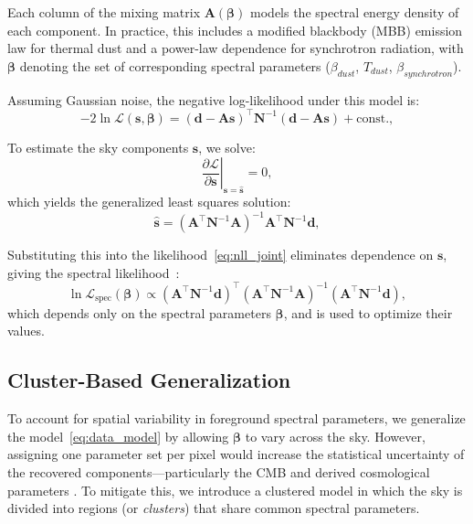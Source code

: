 \documentclass[%
 reprint,
bibnotes,
 amsmath,amssymb,
 aps,
floatfix, 
]{revtex4-2}
\begin{document}
Each column of the mixing matrix \( \mathbf{A}(\boldsymbol{\beta}) \) models the spectral energy density of each component. In practice, this includes a modified blackbody (MBB) emission law for thermal dust and a power-law dependence for synchrotron radiation, with \( \boldsymbol{\beta} \) denoting the set of corresponding spectral parameters ($\beta_{dust}$, $T_{dust}$, $\beta_{synchrotron}$). 

Assuming Gaussian noise, the negative log-likelihood under this model is:
\begin{equation}
    -2 \ln \mathcal{L}(\mathbf{s}, \boldsymbol{\beta}) = (\mathbf{d} - \mathbf{A} \mathbf{s})^\top \mathbf{N}^{-1} (\mathbf{d} - \mathbf{A} \mathbf{s}) + \text{const.},
    \label{eq:nll_joint}
\end{equation}

To estimate the sky components \( \mathbf{s} \), we solve:
\begin{equation}
    \left. \frac{\partial \mathcal{L}}{\partial \mathbf{s}} \right|_{\mathbf{s} = \hat{\mathbf{s}}} = 0,
\end{equation}
which yields the generalized least squares solution:
\begin{equation}
    \hat{\mathbf{s}} = \left( \mathbf{A}^\top \mathbf{N}^{-1} \mathbf{A} \right)^{-1} \mathbf{A}^\top \mathbf{N}^{-1} \mathbf{d},
    \label{eq:mle_solution}
\end{equation}

Substituting this into the likelihood~\eqref{eq:nll_joint} eliminates dependence on \( \mathbf{s} \), giving the spectral likelihood~\citep{Stompor_2009}:
\begin{equation}
    \ln \mathcal{L}_{\mathrm{spec}}(\boldsymbol{\beta}) \propto (\mathbf{A}^\top \mathbf{N}^{-1} \mathbf{d})^\top (\mathbf{A}^\top \mathbf{N}^{-1} \mathbf{A})^{-1} (\mathbf{A}^\top \mathbf{N}^{-1} \mathbf{d}),
    \label{eq:spectral_likelihood}
\end{equation}
which depends only on the spectral parameters \( \boldsymbol{\beta} \), and is used to optimize their values.

\subsection{Cluster-Based Generalization}
\label{subsec:sph_kmeans}

To account for spatial variability in foreground spectral parameters, we generalize the model~\eqref{eq:data_model} by allowing \( \boldsymbol{\beta} \) to vary across the sky. However, assigning one parameter set per pixel would increase the statistical uncertainty of the recovered components—particularly the CMB and derived cosmological parameters \citep{ErrardStompor2018}. To mitigate this, we introduce a clustered model in which the sky is divided into regions (or \textit{clusters}) that share common spectral parameters.
\end{document}
